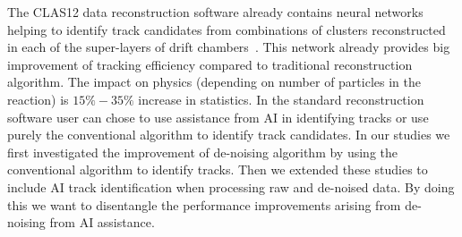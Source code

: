 The CLAS12 data reconstruction software already contains neural networks helping to identify track candidates from combinations of clusters reconstructed in each of the super-layers of drift chambers~\cite{Gavalian:2022mlp}.
This network already provides big improvement of tracking efficiency compared to traditional reconstruction algorithm. The impact on physics (depending on number of particles in the reaction) is $15\%-35\%$ increase in statistics. 
In the standard reconstruction software user can chose to use assistance from AI in identifying tracks or use purely the conventional algorithm to identify track candidates. In our studies we first investigated the improvement of de-noising algorithm by using the conventional algorithm to identify tracks. Then we extended these studies to include AI track identification when processing raw and de-noised data. By doing this we want to disentangle the performance improvements arising from de-noising from AI assistance. 


 
